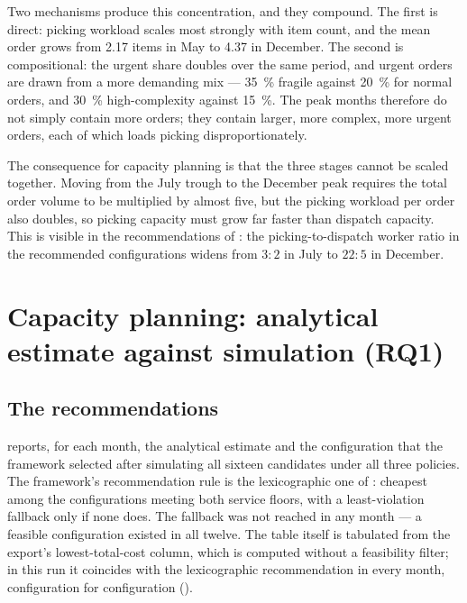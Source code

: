 Two mechanisms produce this concentration, and they compound. The first is direct: picking
workload scales most strongly with item count, and the mean order grows from \num{2.17} items in
May to \num{4.37} in December. The second is compositional: the urgent share doubles over the
same period, and urgent orders are drawn from a more demanding mix --- \SI{35}{\percent} fragile
against \SI{20}{\percent} for normal orders, and \SI{30}{\percent} high-complexity against
\SI{15}{\percent}. The peak months therefore do not simply contain more orders; they contain
larger, more complex, more urgent orders, each of which loads picking disproportionately.

The consequence for capacity planning is that the three stages cannot be scaled together. Moving
from the July trough to the December peak requires the total order volume to be multiplied by
almost five, but the picking workload per order also doubles, so picking capacity must grow far
faster than dispatch capacity. This is visible in the recommendations of
: the picking-to-dispatch worker ratio in the recommended
configurations widens from \(3:2\) in July to \(22:5\) in December.

\section{Capacity planning: analytical estimate against simulation (RQ1)}
\label{sec:res-capacity}

\subsection{The recommendations}

 reports, for each month, the analytical estimate and the
configuration that the framework selected after simulating all sixteen candidates under all
three policies. The framework's recommendation rule is the lexicographic one of
: cheapest among the configurations meeting both service floors, with a
least-violation fallback only if none does. The fallback was not reached in any month --- a
feasible configuration existed in all twelve. The table itself is tabulated from the export's
lowest-total-cost column, which is computed without a feasibility filter; in this run it
coincides with the lexicographic recommendation in every month, configuration for configuration
().

